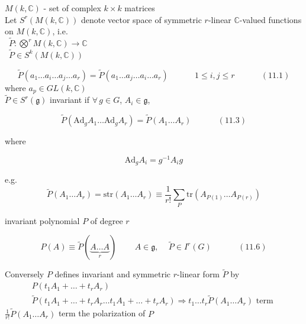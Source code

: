 \documentclass{book}
\begin{document}
$M(k,\mathbb{C})$ - set of complex $k\times k$ matrices  \\

Let $S^r(M(k,\mathbb{C}))$ denote vector space of symmetric $r$-linear $\mathbb{C}$-valued functions on $M(k,\mathbb{C})$, i.e. \\
\quad \quad \, $\widetilde{P}: \bigotimes^r M(k,\mathbb{C}) \to \mathbb{C}$ \\
\quad \quad \quad \, $\widetilde{P} \in S^k(M(k,\mathbb{C}))$ 

\begin{equation}
  \widetilde{P}{ (a_1 \dots a_i \dots a_j \dots a_r ) } =\widetilde{ P}{ (a_1 \dots a_j \dots a_i \dots a_r) } \quad \quad \quad \, 1\leq i , j \leq r \quad \quad \quad \, (11.1)
\end{equation}
where $a_p \in GL(k,\mathbb{C})$ \\

$\widetilde{P} \in S^r(\mathfrak{g})$ invariant if $\forall \, g \in G$, $A_i \in \mathfrak{g}$, 

\begin{equation}
  \widetilde{P}{ (\text{Ad}_g{A_1} \dots \text{Ad}_g{A_r})} = \widetilde{P}(A_1 \dots A_r) \quad \quad \quad \, (11.3)
\end{equation}

where

\[
\text{Ad}_gA_i = g^{-1} A_i g
\]

e.g. 
\begin{equation}
  \widetilde{P}(A_1 \dots A_r) = \text{str}{ (A_1 \dots A_r)}  \equiv \frac{1}{r!} \sum_P \text{tr}{ (A_{ P(1)} \dots A_{P(r)} ) }
\end{equation}


invariant polynomial $P$ of degree $r$

\begin{equation}
  P(A) \equiv \widetilde{P}( \underbrace{ A \dots A }_{ r } ) \quad \quad \, A \in \mathfrak{g}, \quad \, \widetilde{P} \in I^r(G) \quad \quad \quad \, (11.6)
\end{equation}

Conversely $P$ defines invariant and symmetric $r$-linear form $\widetilde{P}$ by 
\[
\begin{gathered}
  P(t_1A_1 + \dots + t_r A_r ) \\ 
  \widetilde{P}(t_1 A_1 + \dots + t_r A_r \dots t_1 A_1 + \dots + t_r A_r ) \Longrightarrow t_1 \dots t_r \widetilde{P}(A_1 \dots A_r) \text{ term }
\end{gathered}
\]
$\frac{1}{r!} \widetilde{P}(A_1 \dots A_r)$ term the polarization of $P$
\end{document}
